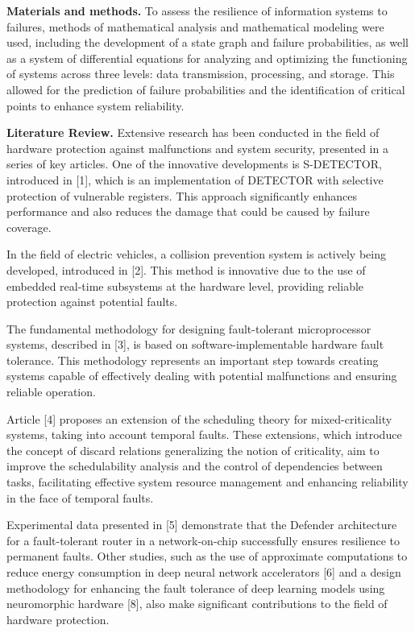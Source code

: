 \textbf{Materials and methods.} To assess the resilience of information
systems to failures, methods of mathematical analysis and mathematical
modeling were used, including the development of a state graph and
failure probabilities, as well as a system of differential equations for
analyzing and optimizing the functioning of systems across three levels:
data transmission, processing, and storage. This allowed for the
prediction of failure probabilities and the identification of critical
points to enhance system reliability.

\textbf{Literature Review.} Extensive research has been conducted in the
field of hardware protection against malfunctions and system security,
presented in a series of key articles. One of the innovative
developments is S-DETECTOR, introduced in {[}1{]}, which is an
implementation of DETECTOR with selective protection of vulnerable
registers. This approach significantly enhances performance and also
reduces the damage that could be caused by failure coverage.

In the field of electric vehicles, a collision prevention system is
actively being developed, introduced in {[}2{]}. This method is
innovative due to the use of embedded real-time subsystems at the
hardware level, providing reliable protection against potential faults.

The fundamental methodology for designing fault-tolerant microprocessor
systems, described in {[}3{]}, is based on software-implementable
hardware fault tolerance. This methodology represents an important step
towards creating systems capable of effectively dealing with potential
malfunctions and ensuring reliable operation.

Article {[}4{]} proposes an extension of the scheduling theory for
mixed-criticality systems, taking into account temporal faults. These
extensions, which introduce the concept of discard relations
generalizing the notion of criticality, aim to improve the
schedulability analysis and the control of dependencies between tasks,
facilitating effective system resource management and enhancing
reliability in the face of temporal faults.

Experimental data presented in {[}5{]} demonstrate that the Defender
architecture for a fault-tolerant router in a network-on-chip
successfully ensures resilience to permanent faults. Other studies, such
as the use of approximate computations to reduce energy consumption in
deep neural network accelerators {[}6{]} and a design methodology for
enhancing the fault tolerance of deep learning models using neuromorphic
hardware {[}8{]}, also make significant contributions to the field of
hardware protection.

